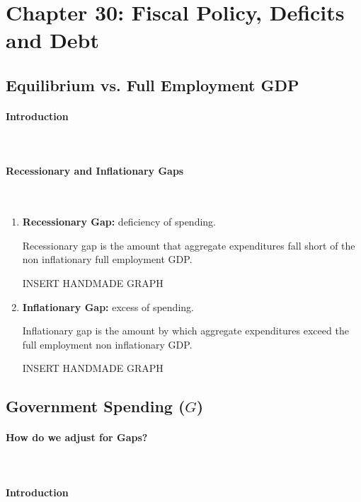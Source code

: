 \newpage
\section{Chapter 30: Fiscal Policy, Deficits and Debt}

\subsection{Equilibrium vs. Full Employment GDP}

\paragraph{Introduction}\ 

\paragraph{Recessionary and Inflationary Gaps}\ 

\begin{enumerate}[label = \textbf{(\arabic*)}]
	\item \textbf{Recessionary Gap:} deficiency of spending.

		Recessionary gap is the amount that aggregate expenditures fall short of the non inflationary full employment GDP.

		INSERT HANDMADE GRAPH

	\item \textbf{Inflationary Gap:} excess of spending.

		Inflationary gap is the amount by which aggregate expenditures exceed the full employment non inflationary  GDP.

		INSERT HANDMADE GRAPH

\end{enumerate}

\subsection{Government Spending ($G$)}

\paragraph{How do we adjust for Gaps?}\ 

\paragraph{Introduction}\ 

